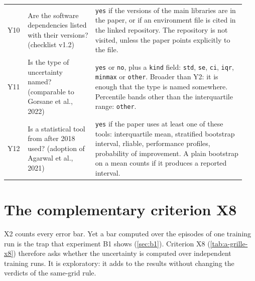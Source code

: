 \begin{small}
\begin{longtable}{@{}p{0.07\linewidth}>{\raggedright\arraybackslash}p{0.27\linewidth}>{\raggedright\arraybackslash}p{0.6\linewidth}@{}}
Y10 & Are the software dependencies listed with their versions? (checklist v1.2) & \texttt{yes} if
  the versions of the main libraries are in the paper, or if an environment file is cited in the
  linked repository. The repository is not visited, unless the paper points explicitly to the file. \\
Y11 & Is the type of uncertainty named? (comparable to Gorsane et al., 2022) & \texttt{yes} or
  \texttt{no}, plus a \texttt{kind} field: \texttt{std}, \texttt{se}, \texttt{ci}, \texttt{iqr},
  \texttt{minmax} or \texttt{other}. Broader than Y2: it is enough that the type is named somewhere.
  Percentile bands other than the interquartile range: \texttt{other}. \\
Y12 & Is a statistical tool from after 2018 used? (adoption of Agarwal et al., 2021) & \texttt{yes}
  if the paper uses at least one of these tools: interquartile mean, stratified bootstrap interval,
  rliable, performance profiles, probability of improvement. A plain bootstrap on a mean counts if
  it produces a reported interval. \\
\end{longtable}
\end{small}

\section{The complementary criterion X8}
\label{sec:a-x8}

X2 counts every error bar. Yet a bar computed over the episodes of one training run is the trap that
experiment B1 shows (\cref{sec:b1}). Criterion X8 (\cref{tab:a-grille-x8}) therefore asks whether the uncertainty is computed
over independent training runs. It is exploratory: it adds to the results without changing the
verdicts of the same-grid rule.

